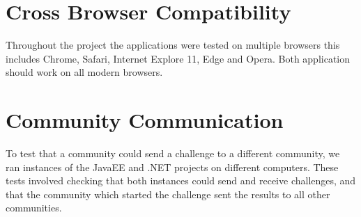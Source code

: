 \section{Cross Browser Compatibility}

Throughout the project the applications were tested on multiple browsers this includes Chrome, Safari, Internet Explore 11, Edge and Opera. Both application should work on all modern browsers.

\section{Community Communication}

To test that a community could send a challenge to a different community, we ran instances of the JavaEE and .NET projects on different computers. These tests involved checking that both instances could send and receive challenges, and that the community which started the challenge sent the results to all other communities.

